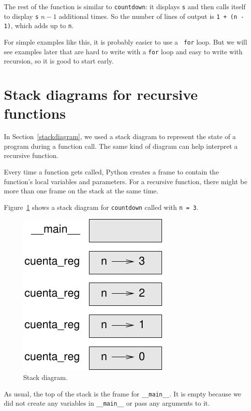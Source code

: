 \documentclass[10pt]{book}
\begin{document}
The rest of the function is similar to {\tt countdown}: it displays
{\tt s} and then calls itself to display {\tt s} $n-1$ additional
times.  So the number of lines of output is {\tt 1 + (n - 1)}, which
adds up to {\tt n}.

For simple examples like this, it is probably easier to use a {\tt
for} loop.  But we will see examples later that are hard to write
with a {\tt for} loop and easy to write with recursion, so it is
good to start early.


\section{Stack diagrams for recursive functions}
\label{recursive.stack}

In Section~\ref{stackdiagram}, we used a stack diagram to represent
the state of a program during a function call.  The same kind of
diagram can help interpret a recursive function.

Every time a function gets called, Python creates a
frame to contain the function's local variables and parameters.
For a recursive function, there might be more than one frame on the
stack at the same time.

Figure~\ref{fig.stack2} shows a stack diagram for {\tt countdown} called with
{\tt n = 3}.

\begin{figure}
\centerline
{\includegraphics[scale=0.8]{figs/stack2.pdf}}
\caption{Stack diagram.}
\label{fig.stack2}
\end{figure}


As usual, the top of the stack is the frame for \verb"__main__".
It is empty because we did not create any variables in
\verb"__main__" or pass any arguments to it.
\end{document}
